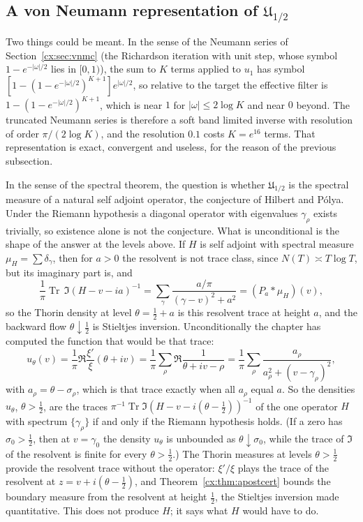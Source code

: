 \subsection{A von Neumann representation of $\mathfrak U_{1/2}$}\label{cx:sec:vonneumann}

Two things could be meant. In the sense of the Neumann series of Section~\ref{cx:sec:vnmc} (the Richardson iteration with unit step, whose symbol $1-e^{-|\omega|/2}$ lies in $[0,1)$), the sum to $K$ terms applied to $u_1$ has symbol $[1-(1-e^{-|\omega|/2})^{K+1}]e^{|\omega|/2}$, so relative to the target the effective filter is $1-(1-e^{-|\omega|/2})^{K+1}$, which is near $1$ for $|\omega|\le2\log K$ and near $0$ beyond. The truncated Neumann series is therefore a soft band limited inverse with resolution of order $\pi/(2\log K)$, and the resolution $0.1$ costs $K=e^{16}$ terms. That representation is exact, convergent and useless, for the reason of the previous subsection.

In the sense of the spectral theorem, the question is whether $\mathfrak U_{1/2}$ is the spectral measure of a natural self adjoint operator, the conjecture of Hilbert and P\'olya. Under the Riemann hypothesis a diagonal operator with eigenvalues $\gamma_\rho$ exists trivially, so existence alone is not the conjecture. What is unconditional is the shape of the answer at the levels above. If $H$ is self adjoint with spectral measure $\mu_H=\sum\delta_{\gamma}$, then for $a>0$ the resolvent is not trace class, since $N(T)\asymp T\log T$, but its imaginary part is, and
\[
\frac1\pi\operatorname{Tr}\,\Im(H-v-ia)^{-1}=\sum_\gamma\frac{a/\pi}{(\gamma-v)^2+a^2}=(P_a*\mu_H)(v),
\]
so the Thorin density at level $\theta=\tfrac12+a$ is this resolvent trace at height $a$, and the backward flow $\theta\downarrow\tfrac12$ is Stieltjes inversion. Unconditionally the chapter has computed the function that would be that trace:
\[
u_\theta(v)=\frac1\pi\Re\frac{\xi'}\xi(\theta+iv)=\frac1\pi\sum_\rho\Re\frac1{\theta+iv-\rho}=\frac1\pi\sum_\rho\frac{a_\rho}{a_\rho^2+(v-\gamma_\rho)^2},
\]
with $a_\rho=\theta-\sigma_\rho$, which is that trace exactly when all $a_\rho$ equal $a$. So the densities $u_\theta$, $\theta>\tfrac12$, are the traces $\pi^{-1}\operatorname{Tr}\Im(H-v-i(\theta-\tfrac12))^{-1}$ of the one operator $H$ with spectrum $\{\gamma_\rho\}$ if and only if the Riemann hypothesis holds. (If a zero has $\sigma_0>\tfrac12$, then at $v=\gamma_0$ the density $u_\theta$ is unbounded as $\theta\downarrow\sigma_0$, while the trace of $\Im$ of the resolvent is finite for every $\theta>\tfrac12$.) The Thorin measures at levels $\theta>\tfrac12$ provide the resolvent trace without the operator: $\xi'/\xi$ plays the trace of the resolvent at $z=v+i(\theta-\tfrac12)$, and Theorem~\ref{cx:thm:apostcert} bounds the boundary measure from the resolvent at height $\tfrac12$, the Stieltjes inversion made quantitative. This does not produce $H$; it says what $H$ would have to do.

